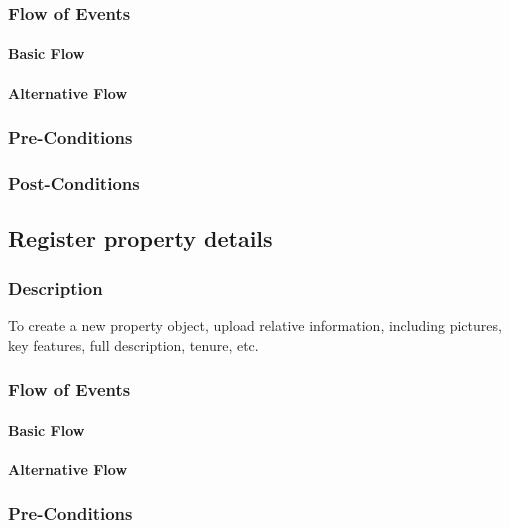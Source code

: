 \documentclass[a4paper,12pt]{article}
\begin{document}
\subsubsection{Flow of Events}
\paragraph{Basic Flow}
\begin{itemize}
\end{itemize}
\paragraph{Alternative Flow}
\begin{itemize}
\end{itemize}
\subsubsection{Pre-Conditions}
\subsubsection{Post-Conditions}

\subsection{Register property details}
\subsubsection{Description}
To create a new property object, upload relative information, including pictures, key features, full description, tenure, etc.
\subsubsection{Flow of Events}
\paragraph{Basic Flow}
\begin{itemize}
\end{itemize}
\paragraph{Alternative Flow}
\begin{itemize}
\end{itemize}
\subsubsection{Pre-Conditions}
\end{document}
